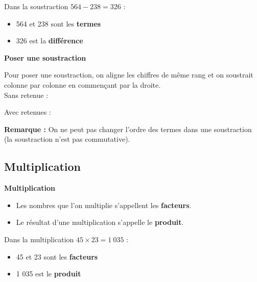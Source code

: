 \begin{examplebox}
	Dans la soustraction $564 - 238 = 326$ :
	\begin{itemize}[label = \textbullet]
		\item 564 et 238 sont les \textbf{termes}
		\item 326 est la \textbf{différence}
	\end{itemize}
\end{examplebox}

\begin{methodebox}
	\textbf{Poser une soustraction}
	
	Pour poser une soustraction, on aligne les chiffres de même rang et on soustrait colonne par colonne en commençant par la droite.\\[0.5cm]
	
	Sans retenue :
	\begin{center}
	\end{center}
	
	Avec retenues :
	\begin{center}
	\end{center}
\end{methodebox}

\textbf{Remarque :} On ne peut pas changer l'ordre des termes dans une soustraction (la soustraction n'est pas commutative).

\subsection{Multiplication}

\begin{definitionbox}
	\textbf{Multiplication}
	\begin{itemize}[label = \textbullet]
		\item Les nombres que l'on multiplie s'appellent les \textbf{facteurs}.
		\item Le résultat d'une multiplication s'appelle le \textbf{produit}.
	\end{itemize}
\end{definitionbox}

\begin{examplebox}
	Dans la multiplication $45 \times 23 = 1~035$ :
	\begin{itemize}[label = \textbullet]
		\item 45 et 23 sont les \textbf{facteurs}
		\item 1 035 est le \textbf{produit}
	\end{itemize}
\end{examplebox}

